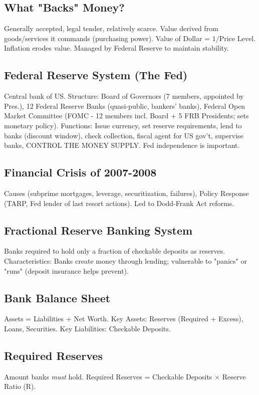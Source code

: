 \documentclass{article}
\begin{document}
\subsection*{What "Backs" Money?}
Generally accepted, legal tender, relatively scarce. Value derived from goods/services it commands (purchasing power). Value of Dollar = $1 / \text{Price Level}$. Inflation erodes value. Managed by Federal Reserve to maintain stability.

\subsection*{Federal Reserve System (The Fed)}
Central bank of US. Structure: Board of Governors (7 members, appointed by Pres.), 12 Federal Reserve Banks (quasi-public, bankers' banks), Federal Open Market Committee (FOMC - 12 members incl. Board + 5 FRB Presidents; sets monetary policy). Functions: Issue currency, set reserve requirements, lend to banks (discount window), check collection, fiscal agent for US gov't, supervise banks, CONTROL THE MONEY SUPPLY. Fed independence is important.

\subsection*{Financial Crisis of 2007-2008}
Causes (subprime mortgages, leverage, securitization, failures), Policy Response (TARP, Fed lender of last resort actions). Led to Dodd-Frank Act reforms.

\subsection*{Fractional Reserve Banking System}
Banks required to hold only a fraction of checkable deposits as reserves. Characteristics: Banks create money through lending; vulnerable to "panics" or "runs" (deposit insurance helps prevent).

\subsection*{Bank Balance Sheet}
Assets = Liabilities + Net Worth. Key Assets: Reserves (Required + Excess), Loans, Securities. Key Liabilities: Checkable Deposits.

\subsection*{Required Reserves}
Amount banks \textit{must} hold. Required Reserves = Checkable Deposits $\times$ Reserve Ratio (R).
\end{document}
